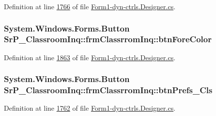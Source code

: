 \-Definition at line \hyperlink{_form1-dyn-ctrls_8_designer_8cs_source_l01766}{1766} of file \hyperlink{_form1-dyn-ctrls_8_designer_8cs_source}{\-Form1-\/dyn-\/ctrls.\-Designer.\-cs}.

\hypertarget{class_sr_p___classroom_inq_1_1frm_classrrom_inq_af3a459dee89d074c46f08528279e61e0}{
\subsubsection[{btn\-Fore\-Color}]{\setlength{\rightskip}{0pt plus 5cm}\-System.\-Windows.\-Forms.\-Button {\bf \-Sr\-P\-\_\-\-Classroom\-Inq\-::frm\-Classrrom\-Inq\-::btn\-Fore\-Color}}}
\label{class_sr_p___classroom_inq_1_1frm_classrrom_inq_af3a459dee89d074c46f08528279e61e0}


\-Definition at line \hyperlink{_form1-dyn-ctrls_8_designer_8cs_source_l01863}{1863} of file \hyperlink{_form1-dyn-ctrls_8_designer_8cs_source}{\-Form1-\/dyn-\/ctrls.\-Designer.\-cs}.

\hypertarget{class_sr_p___classroom_inq_1_1frm_classrrom_inq_ab11e101a873395b24e8894ac84d7d318}{
\subsubsection[{btn\-Prefs\-\_\-\-Cls}]{\setlength{\rightskip}{0pt plus 5cm}\-System.\-Windows.\-Forms.\-Button {\bf \-Sr\-P\-\_\-\-Classroom\-Inq\-::frm\-Classrrom\-Inq\-::btn\-Prefs\-\_\-\-Cls}}}
\label{class_sr_p___classroom_inq_1_1frm_classrrom_inq_ab11e101a873395b24e8894ac84d7d318}


\-Definition at line \hyperlink{_form1-dyn-ctrls_8_designer_8cs_source_l01762}{1762} of file \hyperlink{_form1-dyn-ctrls_8_designer_8cs_source}{\-Form1-\/dyn-\/ctrls.\-Designer.\-cs}.

